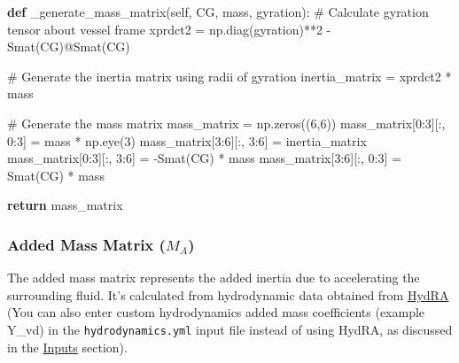 \documentclass[
  letterpaper,
  DIV=11,
  numbers=noendperiod]{scrreprt}
\newenvironment{Shaded}{\begin{snugshade}}{\end{snugshade}}
\newcommand{\CommentTok}[1]{\textcolor[rgb]{0.37,0.37,0.37}{#1}}
\newcommand{\ControlFlowTok}[1]{\textcolor[rgb]{0.00,0.23,0.31}{\textbf{#1}}}
\newcommand{\DecValTok}[1]{\textcolor[rgb]{0.68,0.00,0.00}{#1}}
\newcommand{\KeywordTok}[1]{\textcolor[rgb]{0.00,0.23,0.31}{\textbf{#1}}}
\newcommand{\NormalTok}[1]{\textcolor[rgb]{0.00,0.23,0.31}{#1}}
\newcommand{\OperatorTok}[1]{\textcolor[rgb]{0.37,0.37,0.37}{#1}}
\newcommand{\VariableTok}[1]{\textcolor[rgb]{0.07,0.07,0.07}{#1}}
\begin{document}
\begin{Shaded}
\begin{Highlighting}[]
\KeywordTok{def}\NormalTok{ \_generate\_mass\_matrix(}\VariableTok{self}\NormalTok{, CG, mass, gyration):}
    \CommentTok{\# Calculate gyration tensor about vessel frame}
\NormalTok{    xprdct2 }\OperatorTok{=}\NormalTok{ np.diag(gyration)}\OperatorTok{**}\DecValTok{2} \OperatorTok{{-}}\NormalTok{ Smat(CG)}\OperatorTok{@}\NormalTok{Smat(CG)}
    
    \CommentTok{\# Generate the inertia matrix using radii of gyration}
\NormalTok{    inertia\_matrix }\OperatorTok{=}\NormalTok{ xprdct2 }\OperatorTok{*}\NormalTok{ mass}

    \CommentTok{\# Generate the mass matrix}
\NormalTok{    mass\_matrix }\OperatorTok{=}\NormalTok{ np.zeros((}\DecValTok{6}\NormalTok{,}\DecValTok{6}\NormalTok{))}
\NormalTok{    mass\_matrix[}\DecValTok{0}\NormalTok{:}\DecValTok{3}\NormalTok{][:, }\DecValTok{0}\NormalTok{:}\DecValTok{3}\NormalTok{] }\OperatorTok{=}\NormalTok{ mass }\OperatorTok{*}\NormalTok{ np.eye(}\DecValTok{3}\NormalTok{)}
\NormalTok{    mass\_matrix[}\DecValTok{3}\NormalTok{:}\DecValTok{6}\NormalTok{][:, }\DecValTok{3}\NormalTok{:}\DecValTok{6}\NormalTok{] }\OperatorTok{=}\NormalTok{ inertia\_matrix}
\NormalTok{    mass\_matrix[}\DecValTok{0}\NormalTok{:}\DecValTok{3}\NormalTok{][:, }\DecValTok{3}\NormalTok{:}\DecValTok{6}\NormalTok{] }\OperatorTok{=} \OperatorTok{{-}}\NormalTok{Smat(CG) }\OperatorTok{*}\NormalTok{ mass}
\NormalTok{    mass\_matrix[}\DecValTok{3}\NormalTok{:}\DecValTok{6}\NormalTok{][:, }\DecValTok{0}\NormalTok{:}\DecValTok{3}\NormalTok{] }\OperatorTok{=}\NormalTok{ Smat(CG) }\OperatorTok{*}\NormalTok{ mass}

    \ControlFlowTok{return}\NormalTok{ mass\_matrix}
\end{Highlighting}
\end{Shaded}

\subsubsection*{\texorpdfstring{Added Mass Matrix
(\(M_A\))}{Added Mass Matrix (M\_A)}}\label{added-mass-matrix-m_a}

The added mass matrix represents the added inertia due to accelerating
the surrounding fluid. It's calculated from hydrodynamic data obtained
from \href{https://hydra.hydratech.in/}{HydRA} (You can also enter
custom hydrodynamics added mass coefficients (example Y\_vd) in the
\texttt{hydrodynamics.yml} input file instead of using HydRA, as
discussed in the \href{../Inputs/inputs.qmd}{Inputs} section).
\end{document}
